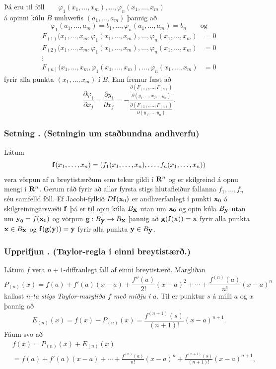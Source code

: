\subsubsection{}
$\text{Þá eru til föll} \qquad \varphi_1(x_1,\ldots,x_m),\ldots,\varphi_n(x_1,\ldots,x_m)$ \\
á opinni kúlu $B$ umhverfis $(a_1,\ldots,a_m)$
þannig að 
$$\varphi_1(a_1,\ldots,a_m)=b_1,\ldots,\varphi_n(a_1,\ldots,a_m)=b_n \qquad \text{og}$$
\begin{align*}
F_{(1)}(x_1,\ldots,x_m, \varphi_1(x_1,\ldots,x_m),\ldots,
\varphi_n(x_1,\ldots,x_m)&=0\\
F_{(2)}(x_1,\ldots,x_m, \varphi_1(x_1,\ldots,x_m),\ldots,
\varphi_n(x_1,\ldots,x_m)&=0\\
\vdots\\
F_{(n)}(x_1,\ldots,x_m, \varphi_1(x_1,\ldots,x_m),\ldots,
\varphi_n(x_1,\ldots,x_m)&=0
\end{align*}
fyrir alla punkta $(x_1,\ldots,x_m)$ í $B$.
Enn fremur fæst að %
$$\frac{\partial \varphi_i}{\partial x_j}
=\frac{\partial y_i}{\partial x_j}
=-\frac{\frac{\partial(F_{(1)}, \ldots, F_{(n)})}
{\partial( y_1, \ldots,x_j,\ldots y_n)}}
{\frac{\partial(F_{(1)}, \ldots, F_{(n)})}{\partial( y_1, \ldots, y_n)}}.$$



\subsubsection{Setning \kaflanr. (Setningin um staðbundna andhverfu)}
Látum $$\mbox{${\bf f}$}(x_1,\ldots,
x_n)=(f_1(x_1,\ldots,x_n),\ldots,f_n(x_1,\ldots,x_n))$$ vera vörpun af
$n$ breytistærðum sem tekur gildi í $\mbox{${\bf R}^n$}$ og er skilgreind á opnu
mengi í $\mbox{${\bf R}^n$}$.   Gerum ráð fyrir að allar
fyrsta stigs hlutafleiður fallanna $f_1, \ldots, f_n$ séu samfelld
föll.  Ef Jacobi-fylkið $D\mbox{${\bf f}$}(\mbox{${\bf x}$}_0)$ er andhverfanlegt í punkti
$\mbox{${\bf x}$}_0$ á skilgreiningarsvæði $\mbox{${\bf f}$}$ þá er til opin kúla $B_{\mbox{${\bf x}$}}$ utan
um $\mbox{${\bf x}$}_0$ og opin kúla $B_{\mbox{${\bf y}$}}$ utan um $\mbox{${\bf y}$}_0=f(\mbox{${\bf x}$}_0)$ og vörpun
$\mbox{${\bf g}$}:B_{\mbox{${\bf y}$}}\rightarrow B_{\mbox{${\bf x}$}}$ þannig að 
$\mbox{${\bf g}$}(\mbox{${\bf f}$}(\mbox{${\bf x}$}))=\mbox{${\bf x}$}$ fyrir alla punkta $\mbox{${\bf x}$}\in B_{\mbox{${\bf x}$}}$ og 
$\mbox{${\bf f}$}(\mbox{${\bf g}$}(\mbox{${\bf y}$}))=\mbox{${\bf y}$}$ fyrir alla punkta $\mbox{${\bf y}$}\in B_{\mbox{${\bf y}$}}$.




\subsubsection{Upprifjun \kaflanr. (Taylor-regla í einni breytistærð.)}
  Látum 
$f$ vera $n+1$-diffranlegt fall af einni breytistærð.  Margliðan 
$$P_{(n)}(x)=f(a)+f'(a)(x-a)+\frac{f''(a)}{2!}(x-a)^2
+\cdots+\frac{f^{(n)}(a)}{n!}(x-a)^n$$
kallast {\em $n$-ta stigs Taylor-margliða $f$ með miðju í $a$}.
Til er punktur $s$ á milli $a$ og $x$ þannig að 
$$E_{(n)}(x)=f(x)-P_{(n)}(x)=\frac{f^{(n+1)}(s)}{(n+1)!}(x-a)^{n+1}.$$
Fáum svo að 
\begin {align*}
&f(x)=P_{(n)}(x)+E_{(n)}(x) \\
&=f(a)+f'(a)(x-a)+\cdots+\frac{f^{(n)}(a)}{n!}(x-a)^n
+\frac{f^{(n+1)}(s)}{(n+1)!}(x-a)^{n+1}, 
\end {align*}

